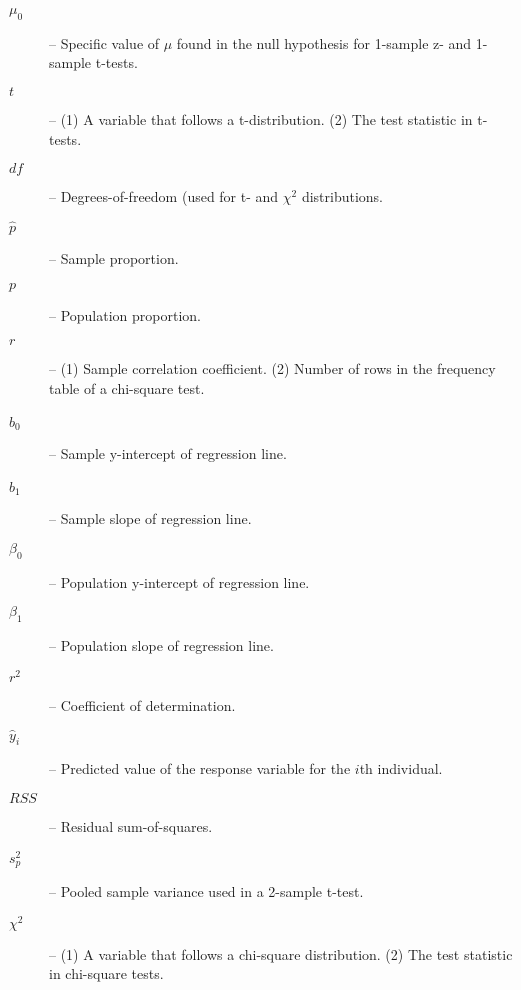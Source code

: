 \begin{description}
  \item[$\mu_{0}$] -- Specific value of $\mu$ found in the null hypothesis for 1-sample z- and 1-sample t-tests.
  \item[$t$] -- (1) A variable that follows a t-distribution.  (2) The test statistic in t-tests.
  \item[$df$] -- Degrees-of-freedom (used for t- and $\chi^{2}$ distributions.
  \item[$\hat{p}$] -- Sample proportion.
  \item[$p$] -- Population proportion.
  \item[$r$] -- (1) Sample correlation coefficient.  (2) Number of rows in the frequency table of a chi-square test.
  \item[$\hat{b}_{0}$] -- Sample y-intercept of regression line.
  \item[$\hat{b}_{1}$] -- Sample slope of regression line.
  \item[$\beta_{0}$] -- Population y-intercept of regression line.
  \item[$\beta_{1}$] -- Population slope of regression line.
  \item[$r^{2}$] -- Coefficient of determination.
  \item[$\hat{y}_{i}$] -- Predicted value of the response variable for the $i$th individual.
  \item[$RSS$] -- Residual sum-of-squares.
  \item[$s_{p}^{2}$] -- Pooled sample variance used in a 2-sample t-test.
  \item[$\chi^{2}$] -- (1) A variable that follows a chi-square distribution.  (2) The test statistic in chi-square tests.
\end{description}
